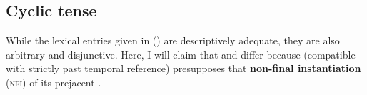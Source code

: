 %
%
%


\subsection{Cyclic tense}

While the lexical entries given in (\lastx) are descriptively adequate, they are also arbitrary and disjunctive. Here, I will claim that \I{} and \III{} differ because \III{} (compatible with strictly past temporal reference) presupposes that \textbf{non-final instantiation} (\textsc{nfi}) of its prejacent \citep[cf.][]{Condoravdi2014}. 

